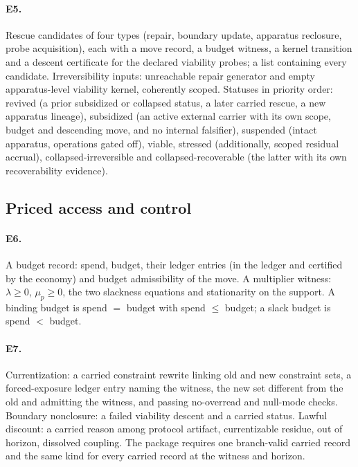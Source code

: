 \paragraph{E5.} Rescue candidates of four types (repair, boundary update, apparatus reclosure, probe
acquisition), each with a move record, a budget witness, a kernel transition and a descent
certificate for the declared viability probes; a list containing every candidate. Irreversibility
inputs: unreachable repair generator and empty apparatus-level viability kernel, coherently scoped.
Statuses in priority order: revived (a prior subsidized or collapsed status, a later carried rescue, a
new apparatus lineage), subsidized (an active external carrier with its own scope, budget and
descending move, and no internal falsifier), suspended (intact apparatus, operations gated off),
viable, stressed (additionally, scoped residual accrual), collapsed-irreversible and
collapsed-recoverable (the latter with its own recoverability evidence).

\subsection{Priced access and control}

\paragraph{E6.} A budget record: spend, budget, their ledger entries (in the ledger and certified by
the economy) and budget admissibility of the move. A multiplier witness: $\lambda \ge 0$, $\mu_p \ge
0$, the two slackness equations and stationarity on the support. A binding budget is spend $=$
budget with spend $\le$ budget; a slack budget is spend $<$ budget.

\paragraph{E7.} Currentization: a carried constraint rewrite linking old and new constraint sets, a
forced-exposure ledger entry naming the witness, the new set different from the old and admitting
the witness, and passing no-overread and null-mode checks. Boundary nonclosure: a failed viability
descent and a carried status. Lawful discount: a carried reason among protocol artifact,
currentizable residue, out of horizon, dissolved coupling. The package requires one branch-valid
carried record and the same kind for every carried record at the witness and horizon.

